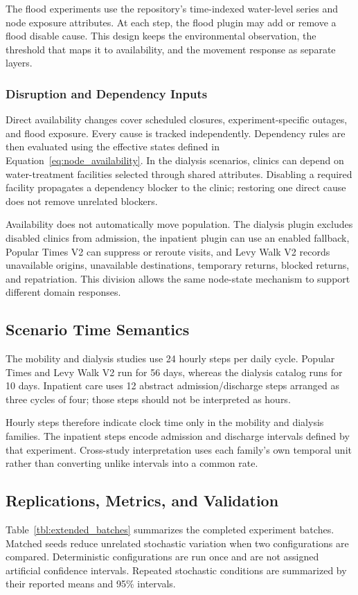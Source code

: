 \documentclass[pdflatex,sn-mathphys-num]{sn-jnl}%
\theoremstyle{thmstyleone}%
\theoremstyle{thmstyletwo}%
\theoremstyle{thmstylethree}%
\begin{document}
The flood experiments use the repository's time-indexed water-level series and node exposure attributes. At each step, the flood plugin may add or remove a flood disable cause. This design keeps the environmental observation, the threshold that maps it to availability, and the movement response as separate layers.



\subsubsection{Disruption and Dependency Inputs}
Direct availability changes cover scheduled closures, experiment-specific outages, and flood exposure. Every cause is tracked independently. Dependency rules are then evaluated using the effective states defined in Equation~\ref{eq:node_availability}. In the dialysis scenarios, clinics can depend on water-treatment facilities selected through shared attributes. Disabling a required facility propagates a dependency blocker to the clinic; restoring one direct cause does not remove unrelated blockers.

Availability does not automatically move population. The dialysis plugin excludes disabled clinics from admission, the inpatient plugin can use an enabled fallback, Popular Times V2 can suppress or reroute visits, and Levy Walk V2 records unavailable origins, unavailable destinations, temporary returns, blocked returns, and repatriation. This division allows the same node-state mechanism to support different domain responses.



\subsection{Scenario Time Semantics}
The mobility and dialysis studies use 24 hourly steps per daily cycle. Popular Times and Levy Walk V2 run for 56 days, whereas the dialysis catalog runs for 10 days. Inpatient care uses 12 abstract admission/discharge steps arranged as three cycles of four; those steps should not be interpreted as hours. 

Hourly steps therefore indicate clock time only in the mobility and dialysis families. The inpatient steps encode admission and discharge intervals defined by that experiment. Cross-study interpretation uses each family's own temporal unit rather than converting unlike intervals into a common rate.

\subsection{Replications, Metrics, and Validation}
Table~\ref{tbl:extended_batches} summarizes the completed experiment batches. Matched seeds reduce unrelated stochastic variation when two configurations are compared. Deterministic configurations are run once and are not assigned artificial confidence intervals. Repeated stochastic conditions are summarized by their reported means and 95\% intervals.
\end{document}
